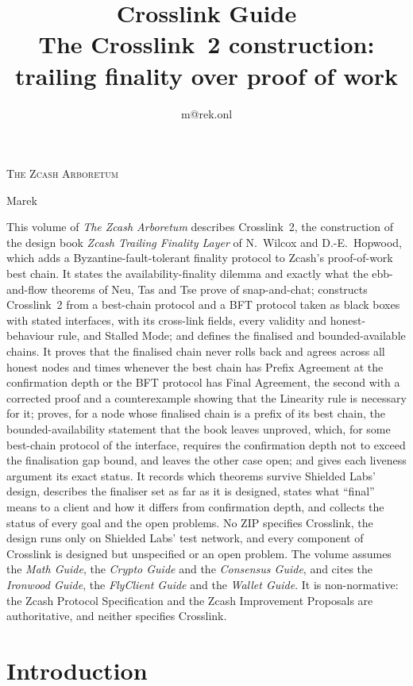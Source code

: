 \documentclass[11pt,a4paper]{article}
\title{\textbf{\Huge Crosslink Guide}\\[6pt]\large The Crosslink~2 construction: trailing finality over proof of work}
\author{m@rek.onl}
\date{}
\makeatletter
\theoremstyle{definition}
\let\arb@tableofcontents\tableofcontents
\renewcommand{\tableofcontents}{{\hypersetup{pdfborderstyle={/S/U/W 0}}%
  \arb@tableofcontents}}
\providecommand{\accession}{}
\def\arb@name#1#2\@nil{\def\arbvolname{#2}}
\def\arb@parsetitle\textbf#1\\[#2]#3#4\@nil{\arb@name#1\@nil\def\arb@sub{#4}}
\providecommand{\arbvolname}{}
\renewcommand{\maketitle}{\expandafter\arb@parsetitle\@title\@nil
  \hypersetup{pdftitle={\arbvolname: \arb@sub},pdfauthor={Marek}}%
  \thispagestyle{empty}\begingroup\raggedright
  {\fontsize{13.2}{16}\selectfont\scshape The Zcash Arboretum\par}
  \vspace*{50mm}
  {\fontsize{47.3}{50}\selectfont\accession\par}
  \vspace{6mm}
  {\fontsize{22.8}{27}\selectfont\arbvolname\par}
  \vspace{3mm}
  {\fontsize{13.2}{17}\selectfont\arb@sub\par}
  \vspace{18mm}
  {\fontsize{13.2}{17}\selectfont Marek\par}
  {\small\@author\par}
  \endgroup\clearpage}
\renewenvironment{abstract}{%
  \small\begin{center}{\bfseries\abstractname}\end{center}\medskip\noindent\ignorespaces
}{\par\medskip}
\makeatother
\begin{document}
\maketitle
\thispagestyle{empty}

\begin{abstract}
This volume of \emph{The Zcash Arboretum} describes Crosslink~2, the
construction of the design book \emph{Zcash Trailing Finality Layer} of
N.~Wilcox and D.-E.~Hopwood, which adds a Byzantine-fault-tolerant finality
protocol to Zcash's proof-of-work best chain. It states the
availability-finality dilemma and exactly what the ebb-and-flow theorems of
Neu, Tas and Tse prove of snap-and-chat; constructs Crosslink~2 from a
best-chain protocol and a BFT protocol taken as black boxes with stated
interfaces, with its cross-link fields, every validity and honest-behaviour
rule, and Stalled Mode; and defines the finalised and bounded-available
chains. It proves that the finalised chain never rolls back and agrees across
all honest nodes and times whenever the best chain has Prefix Agreement at the
confirmation depth or the BFT protocol has Final Agreement, the second with a
corrected proof and a counterexample showing that the Linearity rule is
necessary for it; proves, for a node whose finalised chain is a prefix of its
best chain, the bounded-availability statement that the book leaves unproved,
which, for some best-chain protocol of the interface, requires the confirmation
depth not to exceed the finalisation gap bound, and leaves the other case open;
and
gives each liveness argument its exact status. It records which theorems survive
Shielded Labs' design, describes the finaliser set as far as it is designed,
states what ``final'' means to a client and how it differs from confirmation
depth, and collects the status of every goal and the open problems. No ZIP
specifies Crosslink, the design runs only on Shielded Labs' test network, and
every component of Crosslink is designed but unspecified or an open problem. The
volume assumes the \emph{Math Guide}, the \emph{Crypto Guide} and the
\emph{Consensus Guide}, and cites the \emph{Ironwood Guide}, the \emph{FlyClient
Guide} and the \emph{Wallet Guide}. It is non-normative: the Zcash Protocol
Specification and the Zcash Improvement Proposals are authoritative, and neither
specifies Crosslink.
\end{abstract}
\clearpage \tableofcontents \clearpage

\section{Introduction}\label{sec:intro}
\end{document}
